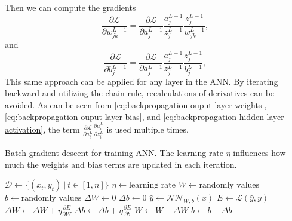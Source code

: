 Then we can compute the gradients
\begin{equation*}
    \frac{\partial \mathcal{L}}{\partial w_{jk}^{L-1}} = \frac{\partial \mathcal{L}}{\partial a_j^{L-1}} \frac{a_j^{L-1}}{z_j^{L-1}} \frac{z_j^{L-1}}{w_{jk}^{L-1}},
\end{equation*}
and
\begin{equation*}
    \frac{\partial \mathcal{L}}{\partial b_j^{L-1}} = \frac{\partial \mathcal{L}}{\partial a_j^{L-1}} \frac{a_j^{L-1}}{z_j^{L-1}} \frac{z_j^{L-1}}{b_j^{L-1}},
\end{equation*}
This same approach can be applied for any layer in the \gls{ANN}.
By iterating backward and utilizing the chain rule, recalculations of derivatives can be avoided.
As can be seen from \autoref{eq:backpropagation-ouput-layer-weights}, \autoref{eq:backpropagation-ouput-layer-bias}, and \autoref{eq:backpropagation-hidden-layer-activation}, the term $\frac{\partial\mathcal{L}}{\partial a_i^L} \frac{\partial a_i^L}{\partial z_i^L}$ is used multiple times.

\begin{algorithm}
    \caption{Batch gradient descent for training \gls{ANN}. The learning rate $\eta$ influences how much the weights and bias terms are updated in each iteration.}
    \label{alg:ann-training}
    \begin{algorithmic}
        \State $\mathcal{D} \gets \{(x_t, y_t)\ |\ t \in [1, n]\}$
        \State $\eta \gets \text{learning rate}$
        \State $W \gets \text{randomly values}$
        \State $b \gets \text{randomly values}$
            \State $\Delta W \gets 0$
            \State $\Delta b \gets 0$
                \State $\hat{y} \gets \mathcal{NN}_{W, b}(x)$
                \State $E \gets \mathcal{L}(\hat{y}, y)$
                \State $\Delta W \gets \Delta W + \eta \frac{\partial E}{\partial W}$
                \State $\Delta b \gets \Delta b + \eta \frac{\partial E}{\partial b}$
            \EndFor
            \State $W \gets W - \Delta W$
            \State $b \gets b - \Delta b$
        \EndWhile
    \end{algorithmic}
\end{algorithm}

